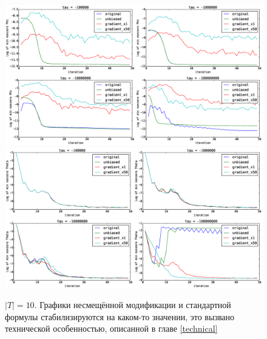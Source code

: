 \documentclass[12pt]{article}
\begin{document}
\begin{figure}[H]
	\centering
	\caption{$|T| = 10$. Графики несмещённой модификации и стандартной формулы стабилизируются на каком-то значении, это вызвано технической особенностью, описанной в главе \ref{technical}}    
	\includegraphics[width=1.0\linewidth]{pictures/topics_10_minPhi_values}
	\includegraphics[width=1.0\linewidth]{pictures/topics_10_minTheta_values}
\end{figure}
\end{document}

